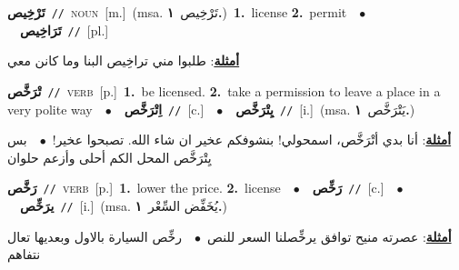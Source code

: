 \documentclass[10pt,a4paper,twoside]{article} %
\begin{document}
\begin{multicols}{2}
{\setlength\topsep{0pt}\textbf{\foreignlanguage{arabic}{تَرْخِيص}}\ {\color{gray}\texttt{//}\color{black}}\ \textsc{noun}\ [m.]\ \color{gray}(msa. \foreignlanguage{arabic}{تَرْخِيص}~\foreignlanguage{arabic}{\textbf{١.}})\color{black}\ \textbf{1.}~license  \textbf{2.}~permit\ \ $\bullet$\ \ \setlength\topsep{0pt}\textbf{\foreignlanguage{arabic}{تَرَاخِيص}}\ {\color{gray}\texttt{//}\color{black}}\ [pl.]\  \begin{flushright}\color{gray}\foreignlanguage{arabic}{\textbf{\underline{\foreignlanguage{arabic}{أمثلة}}}: طلبوا مني تراخِيص البنا وما كانن معي}\end{flushright}\color{black}} \vspace{2mm}

{\setlength\topsep{0pt}\textbf{\foreignlanguage{arabic}{تْرَخَّص}}\ {\color{gray}\texttt{//}\color{black}}\ \textsc{verb}\ [p.]\ \textbf{1.}~be licensed.  \textbf{2.}~take a permission to leave a place in a very polite way\ \ $\bullet$\ \ \setlength\topsep{0pt}\textbf{\foreignlanguage{arabic}{اِتْرَخَّص}}\ {\color{gray}\texttt{//}\color{black}}\ [c.]\ \ $\bullet$\ \ \setlength\topsep{0pt}\textbf{\foreignlanguage{arabic}{يِتْرَخَّص}}\ {\color{gray}\texttt{//}\color{black}}\ [i.]\ \color{gray}(msa. \foreignlanguage{arabic}{يَتْرَخَّص}~\foreignlanguage{arabic}{\textbf{١.}})\color{black}\  \begin{flushright}\color{gray}\foreignlanguage{arabic}{\textbf{\underline{\foreignlanguage{arabic}{أمثلة}}}: أنا بدي أتْرَخَّص، اسمحولي! بنشوفكم عخير ان شاء الله. تصبحوا عخير!\ $\bullet$\ \  بس يِتْرَخَّص المحل الكم أحلى وأزعم حلوان}\end{flushright}\color{black}} \vspace{2mm}

{\setlength\topsep{0pt}\textbf{\foreignlanguage{arabic}{رَخَّص}}\ {\color{gray}\texttt{//}\color{black}}\ \textsc{verb}\ [p.]\ \textbf{1.}~lower the price.  \textbf{2.}~license\ \ $\bullet$\ \ \setlength\topsep{0pt}\textbf{\foreignlanguage{arabic}{رَخِّص}}\ {\color{gray}\texttt{//}\color{black}}\ [c.]\ \ $\bullet$\ \ \setlength\topsep{0pt}\textbf{\foreignlanguage{arabic}{يرَخِّص}}\ {\color{gray}\texttt{//}\color{black}}\ [i.]\ \color{gray}(msa. \foreignlanguage{arabic}{يُخَفِّض السِّعْر}~\foreignlanguage{arabic}{\textbf{١.}})\color{black}\  \begin{flushright}\color{gray}\foreignlanguage{arabic}{\textbf{\underline{\foreignlanguage{arabic}{أمثلة}}}: عصرته منيح توافق يرخِّصلنا السعر للنص\ $\bullet$\ \  رخِّص السيارة بالاول وبعديها تعال نتفاهم}\end{flushright}\color{black}} \vspace{2mm}


\end{multicols}
\end{document}
